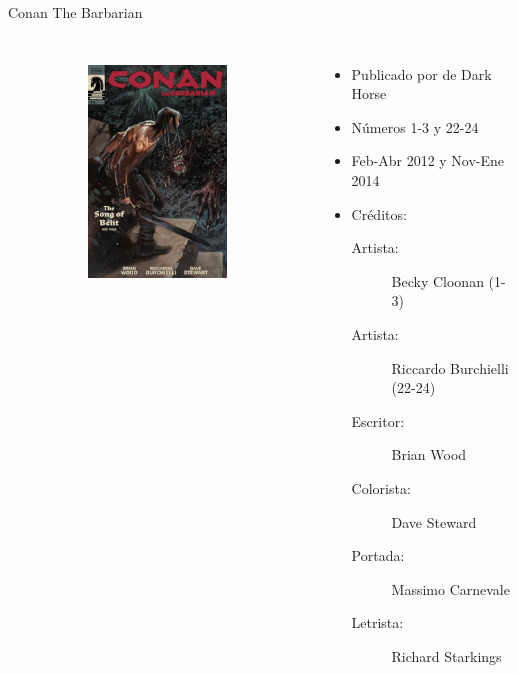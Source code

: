 \begin{frame}{Conan The Barbarian}
\begin{columns}
\begin{figure}[htp]
\begin{subfigure}[b]{0.23\textwidth}
				\includegraphics[width=\textwidth]{img/DH-CTB-24}
			\end{subfigure}
		\end{figure}
		\begin{itemize}
			\item Publicado por de Dark Horse
			\item Números 1-3 y 22-24
			\item Feb-Abr 2012 y Nov-Ene 2014
			\item Créditos:
			\begin{description}
				\item[Artista:] Becky Cloonan (1-3)
				\item[Artista:] Riccardo Burchielli (22-24)
				\item[Escritor:] Brian Wood
				\item[Colorista:] Dave Steward
				\item[Portada:] Massimo Carnevale
				\item[Letrista:] Richard Starkings
			\end{description}
		\end{itemize}
	\end{columns}
\end{frame}
\note[itemize]{
	\item
}

